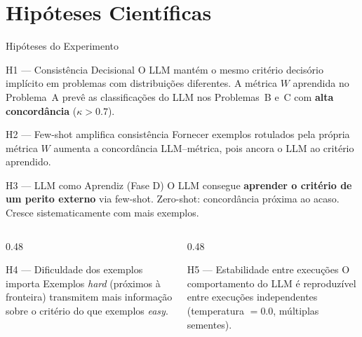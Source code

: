 \documentclass[aspectratio=169, 8pt]{beamer}
\begin{document}
\section{Hipóteses Científicas}

\begin{frame}{Hipóteses do Experimento}
  \begin{block}{H1 --- Consistência Decisional}
    \footnotesize
    O LLM mantém o mesmo critério decisório implícito em problemas com distribuições
    diferentes. A métrica $W$ aprendida no Problema~A prevê as classificações do LLM
    nos Problemas~B e~C com \textbf{alta concordância} ($\kappa > 0.7$).
  \end{block}

  \vspace{0.1em}

  \begin{block}{H2 --- Few-shot amplifica consistência}
    \footnotesize
    Fornecer exemplos rotulados pela própria métrica $W$ aumenta a concordância
    LLM--métrica, pois ancora o LLM ao critério aprendido.
  \end{block}

  \vspace{0.1em}

  \begin{block}{H3 --- LLM como Aprendiz (Fase D)}
    \footnotesize
    O LLM consegue \textbf{aprender o critério de um perito externo} via few-shot.
    Zero-shot: concordância próxima ao acaso. Cresce sistematicamente com mais exemplos.
  \end{block}

  \vspace{0.1em}

  \begin{columns}[T]
    \begin{column}{0.48\textwidth}
      \begin{block}{H4 --- Dificuldade dos exemplos importa}
        \footnotesize
        Exemplos \emph{hard} (próximos à fronteira) transmitem mais
        informação sobre o critério do que exemplos \emph{easy}.
      \end{block}
    \end{column}
    \begin{column}{0.48\textwidth}
      \begin{block}{H5 --- Estabilidade entre execuções}
        \footnotesize
        O comportamento do LLM é reproduzível entre execuções independentes
        (temperatura $= 0.0$, múltiplas sementes).
      \end{block}
    \end{column}
  \end{columns}
\end{frame}
\end{document}
